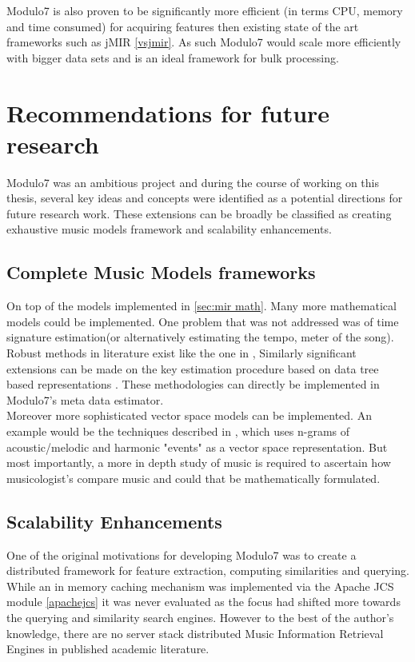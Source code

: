 \noindent Modulo7 is also proven to be significantly more efficient (in terms CPU, memory and time consumed) for acquiring features then existing state of the art frameworks such as jMIR \ref{vsjmir}. As such Modulo7 would scale more efficiently with bigger data sets and is an ideal framework for bulk processing.  

\section{Recommendations for future research}

\noindent Modulo7 was an ambitious project and during the course of working on this thesis, several key ideas and concepts were identified as a potential directions for future research work. These extensions can be broadly be classified as creating exhaustive music models framework and scalability enhancements.

\subsection{Complete Music Models frameworks}

\noindent On top of the models implemented in \ref{sec:mir math}. Many more mathematical models could be implemented. One problem that was not addressed was of time signature estimation(or alternatively estimating the tempo, meter of the song). Robust methods in literature exist like the one in \cite{tempoestimation}, Similarly significant extensions can be made on the key estimation procedure based on data tree based representations \cite{treemodel}. These methodologies can directly be implemented in Modulo7's meta data estimator. \\

\noindent Moreover more sophisticated vector space models can be implemented. An example would be the techniques described in \cite{eventbasedvectormodel}, which uses n-grams of acoustic/melodic and harmonic "events" as a vector space representation. But most importantly, a more in depth study of music is required to ascertain how musicologist's compare music and could that be mathematically formulated. 

\subsection{Scalability Enhancements}

\noindent One of the original motivations for developing Modulo7 was to create a distributed framework for feature extraction, computing similarities and querying. While an in memory caching mechanism was implemented via the Apache JCS module \ref{apachejcs} it was never evaluated as the focus had shifted more towards the querying and similarity search engines. However to the best of the author's knowledge, there are no server stack distributed Music Information Retrieval Engines in published academic literature. 

